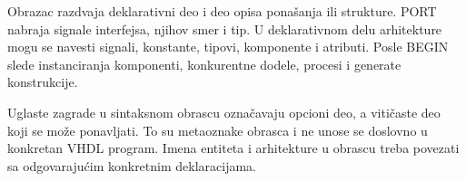 Obrazac razdvaja deklarativni deo i deo opisa ponašanja ili strukture. PORT nabraja signale interfejsa, njihov smer i tip. U deklarativnom delu arhitekture mogu se navesti signali, konstante, tipovi, komponente i atributi. Posle BEGIN slede instanciranja komponenti, konkurentne dodele, procesi i generate konstrukcije.

Uglaste zagrade u sintaksnom obrascu označavaju opcioni deo, a vitičaste deo koji se može ponavljati. To su metaoznake obrasca i ne unose se doslovno u konkretan VHDL program. Imena entiteta i arhitekture u obrascu treba povezati sa odgovarajućim konkretnim deklaracijama.
